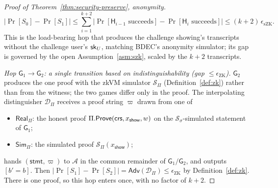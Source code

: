\begin{proof}[Proof of Theorem~\ref{thm:security-preserve}, anonymity]
    \[
      |\Pr[S_0]-\Pr[S_1]|
      \le\sum_{i=1}^{k+2}\bigl|\Pr[\mathsf H_{i-1}\text{ succeeds}]
          -\Pr[\mathsf H_i\text{ succeeds}]\bigr|
      \le (k+2)\,\epsilon_{\mathrm{sZK}}.
    \]
This is the load-bearing hop that produces the challenge showing's transcripts without the challenge user's $\mathsf{sk}_U$, matching BDEC's anonymity simulator; its gap is governed by the open Assumption~\ref{asm:szk}, scaled by the $k+2$ transcripts.

    \smallskip\noindent\emph{Hop $\mathsf G_1\to\mathsf G_2$: a single transition
based on indistinguishability (gap $\le\epsilon_{\mathrm{ZK}}$).} $\mathsf G_2$ produces the one proof with the zkVM simulator $\mathcal S_\Pi$ (Definition~\ref{def:zk}) rather than from the witness; the two games differ only in the proof. The interpolating distinguisher $\mathcal D_\Pi$ receives a proof string $\varpi$ drawn from one of
    \begin{itemize}
      \item $\mathsf{Real}_\Pi$: the honest proof
      $\Pi.\mathsf{Prove}(\mathsf{crs},x_{\mathsf{show}},w)$ on the $\mathcal S_\sigma$-simulated
      statement of $\mathsf G_1$;
      \item $\mathsf{Sim}_\Pi$: the simulated proof
      $\mathcal S_\Pi(x_{\mathsf{show}})$;
    \end{itemize}
hands $(\mathsf{stmt},\varpi)$ to $\mathcal A$ in the common remainder of $\mathsf G_1/\mathsf G_2$, and outputs $[b'=b]$. Then $|\Pr[S_1]-\Pr[S_2]|=\mathsf{Adv}(\mathcal D_\Pi)\le\epsilon_{\mathrm{ZK}}$ by Definition~\ref{def:zk}. There is one proof, so this hop enters once, with no factor of $k+2$.


\end{proof}
